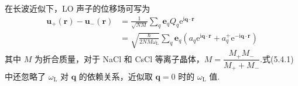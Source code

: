 在长波近似下，LO 声子的位移场可写为
\begin{equation}
\begin{aligned}
  \boldsymbol{u}_{+}\left(\boldsymbol{r}\right)-\boldsymbol{u}_{-}\left(\boldsymbol{r}\right)
  &=\frac{1}{\sqrt{NM}}\sum_{q}\boldsymbol{e}_qQ_q\mathrm{e}^{\mathrm{i}\boldsymbol{q}\cdot\boldsymbol{r}}\\
  &=\sqrt{\frac{\hbar}{2NM\omega_{\mathrm{L}}}}\sum_{q}\boldsymbol{e}_q
  \left(a_q\mathrm{e}^{\mathrm{i}\boldsymbol{q}\cdot\boldsymbol{r}}+a_q^{+}\mathrm{e}^{-\mathrm{i}\boldsymbol{q}\cdot\boldsymbol{r}}\right)
\end{aligned}
\end{equation}
其中 $M$ 为折合质量，对于 NaCl 和 CsCl 等离子晶体，$M=\dfrac{M_+M_-}{M_++M_-}$.式(5.4.1)中还忽略了 $\omega_{\mathrm{L}}$ 对 $\boldsymbol{q}$ 的依赖关系，近似取 $\boldsymbol{q}=0$ 时的 $\omega_{\mathrm{L}}$ 值.

